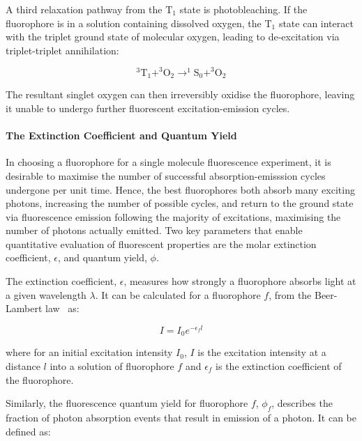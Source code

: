 A third relaxation pathway from the $\text{T}_1$ state is photobleaching. If the fluorophore is in a solution containing dissolved oxygen, the $\text{T}_1$ state can interact with the triplet ground state of molecular oxygen, leading to de-excitation via triplet-triplet annihilation:

\begin{equation}
^3\text{T}_1 + ^3\text{O}_2 \longrightarrow ^1\text{S}_0 + ^3\text{O}_2
\label{eq:blinking1}
\end{equation} 

The resultant singlet oxygen can then irreversibly oxidise the fluorophore, leaving it unable to undergo further fluorescent excitation-emission cycles.   


\paragraph{The Extinction Coefficient and Quantum Yield}
In choosing a fluorophore for a single molecule fluorescence experiment, it is desirable to maximise the number of successful absorption-emisssion cycles undergone per unit time. Hence, the best fluorophores both absorb many exciting photons, increasing the number of possible cycles, and return to the ground state via fluorescence emission following the majority of excitations, maximising the number of photons actually emitted. Two key parameters that enable quantitative evaluation of fluorescent properties are the molar extinction coefficient, $\epsilon$, and quantum yield, $\phi$. 

The extinction coefficient, $\epsilon$, measures how strongly a fluorophore absorbs light at a given wavelength $\lambda$. It can be calculated for a fluorophore $f$, from the Beer-Lambert law~\cite{goldbook2006} as:

\begin{equation}
I = I_0 e^{-\epsilon_f l}
\label{eq:ext_coeff}
\end{equation}

where for an initial excitation intensity $I_0$, $I$ is the excitation intensity at a distance $l$ into a solution of fluorophore $f$ and $\epsilon_f$ is the extinction coefficient of the fluorophore.

Similarly, the fluorescence quantum yield for fluorophore $f$, $\phi_f$, describes the fraction of photon absorption events that result in emission of a photon. It can be defined as: 

